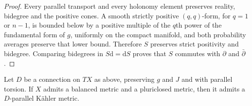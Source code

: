 \begin{proof}
Every parallel transport and every holonomy element preserves reality, bidegree and the positive cones. A smooth strictly positive $(q,q)$-form, for $q=1$ or $n-1$, is bounded below by a positive multiple of the $q$th power of the fundamental form of $g$, uniformly on the compact manifold, and both probability averages preserve that lower bound. Therefore $S$ preserves strict positivity and bidegree. Comparing bidegrees in $S\mathrm d=\mathrm dS$ proves that $S$ commutes with $\partial$ and $\bar\partial$.
\end{proof}

\begin{theorem}\label{thm:parallel-torsion-kahler}
Let $D$ be a connection on $TX$ as above, preserving $g$ and $J$ and with parallel torsion. If $X$ admits a balanced metric and a pluriclosed metric, then it admits a $D$-parallel K\"ahler metric.
\end{theorem}
